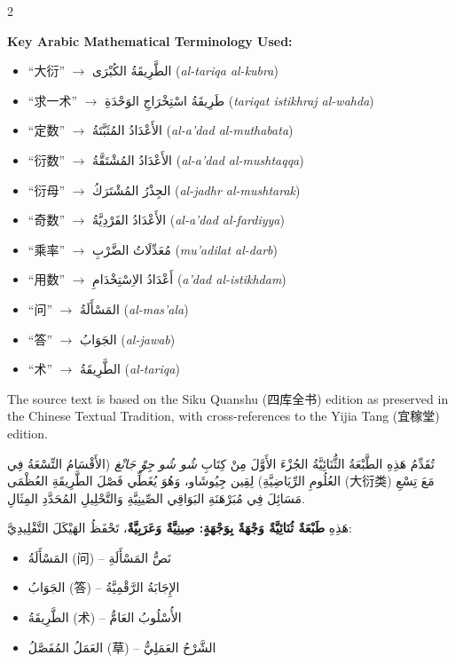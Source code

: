 \documentclass[11pt,a4paper]{article}
\newcommand{\ar}[1]{\arabicfont\beginR #1\endR}
\newcommand{\zhtext}[1]{{\chinese #1}}
\newenvironment{bilingual}{%
  \begin{paracol}{2}
}{%
  \end{paracol}
}
\begin{document}
\begin{bilingual}
\begin{leftcolumn*}
\textbf{Key Arabic Mathematical Terminology Used:}
\begin{itemize}
  \item ``大衍'' $\rightarrow$ \ar{الطَّرِيقَةُ الكُبْرَى} (\textit{al-tariqa al-kubra})
  \item ``求一术'' $\rightarrow$ \ar{طَرِيقَةُ اسْتِخْرَاجِ الوَحْدَةِ} (\textit{tariqat istikhraj al-wahda})
  \item ``定数'' $\rightarrow$ \ar{الأَعْدَادُ المُثَبَّتَةُ} (\textit{al-a'dad al-muthabata})
  \item ``衍数'' $\rightarrow$ \ar{الأَعْدَادُ المُشْتَقَّةُ} (\textit{al-a'dad al-mushtaqqa})
  \item ``衍母'' $\rightarrow$ \ar{الجِذْرُ المُشْتَرَكُ} (\textit{al-jadhr al-mushtarak})
  \item ``奇数'' $\rightarrow$ \ar{الأَعْدَادُ الفَرْدِيَّةُ} (\textit{al-a'dad al-fardiyya})
  \item ``乘率'' $\rightarrow$ \ar{مُعَدِّلَاتُ الضَّرْبِ} (\textit{mu'adilat al-darb})
  \item ``用数'' $\rightarrow$ \ar{أَعْدَادُ الاِسْتِخْدَامِ} (\textit{a'dad al-istikhdam})
  \item ``问'' $\rightarrow$ \ar{المَسْأَلَةُ} (\textit{al-mas'ala})
  \item ``答'' $\rightarrow$ \ar{الجَوَابُ} (\textit{al-jawab})
  \item ``术'' $\rightarrow$ \ar{الطَّرِيقَةُ} (\textit{al-tariqa})
\end{itemize}

The source text is based on the Siku Quanshu (\zhtext{四库全书}) edition as preserved in the Chinese Textual Tradition, with cross-references to the Yijia Tang (\zhtext{宜稼堂}) edition.
\end{leftcolumn*}

\begin{rightcolumn*}
\ar{تُقَدِّمُ هَذِهِ الطَّبْعَةُ الثُّنَائِيَّةُ الجُزْءَ الأَوَّلَ مِنْ كِتَابِ \textit{شُو شُو جِوْ جَانْغ} (الأَقْسَامُ التِّسْعَةُ فِي العُلُومِ الرِّيَاضِيَّةِ) لِقِين جِيُوشَاو، وَهُوَ يُغَطِّي فَصْلَ الطَّرِيقَةِ العُظْمَى (大衍类) مَعَ تِسْعِ مَسَائِلَ فِي مُبَرْهَنَةِ البَوَاقِي الصِّينِيَّةِ وَالتَّحْلِيلِ المُحَدَّدِ المِثَالِ.}

\ar{هَذِهِ \textbf{طَبْعَةٌ ثُنَائِيَّةٌ وَجْهَةٌ بِوَجْهَةٍ: صِينِيَّةٌ وَعَرَبِيَّةٌ}، تَحْفَظُ الهَيْكَلَ التَّقْلِيدِيَّ:}
\begin{itemize}
  \item \ar{المَسْأَلَةُ (问) -- نَصُّ المَسْأَلَةِ}
  \item \ar{الجَوَابُ (答) -- الإِجَابَةُ الرَّقْمِيَّةُ}
  \item \ar{الطَّرِيقَةُ (术) -- الأُسْلُوبُ العَامُّ}
  \item \ar{العَمَلُ المُفَصَّلُ (草) -- الشَّرْحُ العَمَلِيُّ}
\end{itemize}


\end{rightcolumn*}
\end{bilingual}
\end{document}
